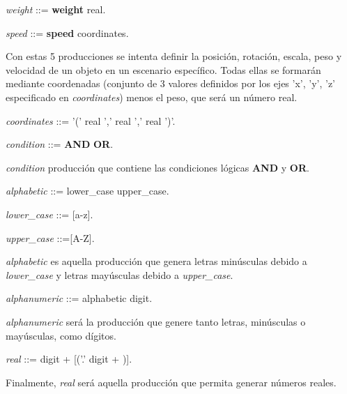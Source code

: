 \documentclass[12pt]{article}
\begin{document}
\noindent \textit{weight} ::= \textbf{weight} real.

\noindent \textit{speed} ::= \textbf{speed} coordinates.

Con estas 5 producciones se intenta definir la posición, rotación, escala, peso y velocidad de un objeto en un escenario específico. Todas ellas se formarán mediante coordenadas (conjunto de 3 valores definidos por los ejes 'x', 'y', 'z' especificado en \textit{coordinates}) menos el peso, que será un número real.

\noindent \textit{coordinates} ::= '(' real ',' real ','  real ')'.

\noindent \textit{condition} ::= \textbf{AND} \textbar \textbf{OR}.

\textit{condition} producción que contiene las condiciones lógicas \textbf{AND} y \textbf{OR}.

\noindent \textit{alphabetic} ::= lower\_case  \textbar  upper\_case.

\noindent \textit{lower\_case} ::= [a-z].

\noindent \textit{upper\_case} ::=[A-Z].

\textit{alphabetic} es aquella producción que genera letras minúsculas debido a \textit{lower\_case} y letras mayúsculas debido a \textit{upper\_case}.

\noindent \textit{alphanumeric} ::= alphabetic \textbar digit.

\textit{alphanumeric} será la producción que genere tanto letras, minúsculas o mayúsculas, como dígitos.

\noindent \textit{real} ::= digit + [('.' digit + )].

Finalmente, \textit{real} será aquella producción que permita generar números reales.

\newpage


\end{document}
